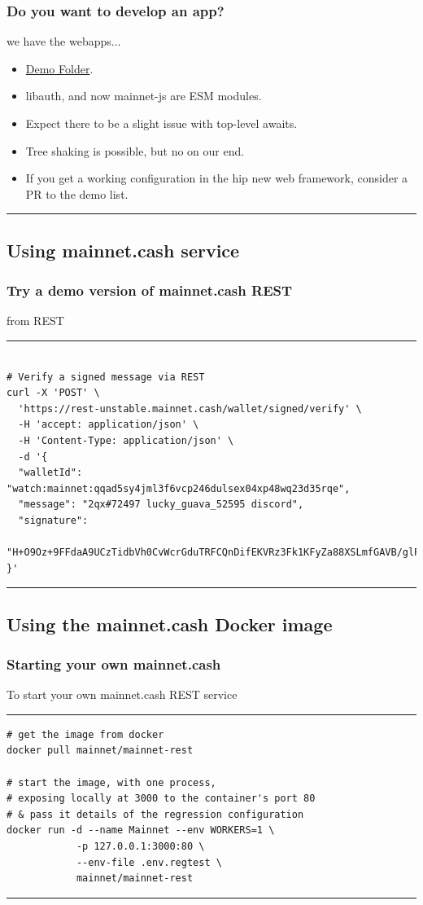 \documentclass{beamer}
\begin{document}
\begin{frame}[fragile]
    \frametitle{Do you want to develop an app?}
    we have the webapps...
    \begin{itemize}
      \item
        \href{https://github.com/mainnet-cash/mainnet-js/tree/master/demo/vue-nuxt}{Demo Folder}.
        \item
        libauth, and now mainnet-js are ESM modules.
        \item
        Expect there to be a slight issue with top-level awaits.
        \item
        Tree shaking is possible, but no on our end.
        \item
        If you get a working configuration in the hip new web framework, consider a PR to the demo list.
      \end{itemize}
        
\rule{\textwidth}{0.4pt}
\end{frame}

\subsection[Unstable REST]{Using mainnet.cash service}

\begin{frame}[fragile]
  \frametitle{Try a demo version of mainnet.cash REST}
    from REST
  \rule{\textwidth}{0.4pt}
  \tiny
  \begin{verbatim}
    
# Verify a signed message via REST
curl -X 'POST' \
  'https://rest-unstable.mainnet.cash/wallet/signed/verify' \
  -H 'accept: application/json' \
  -H 'Content-Type: application/json' \
  -d '{
  "walletId": "watch:mainnet:qqad5sy4jml3f6vcp246dulsex04xp48wq23d35rqe",
  "message": "2qx#72497 lucky_guava_52595 discord",
  "signature": 
  "H+O9Oz+9FFdaA9UCzTidbVh0CvWcrGduTRFCQnDifEKVRz3Fk1KFyZa88XSLmfGAVB/glP8OFRJqSatZtzo8h9I="
}'

  \end{verbatim}
\rule{\textwidth}{0.6pt}
\end{frame}

\subsection[Docker image]{Using the mainnet.cash Docker image}

\begin{frame}[fragile]
    \frametitle{Starting your own mainnet.cash}
      To start your own mainnet.cash REST service
    \rule{\textwidth}{0.9pt}
    \tiny
    \begin{verbatim}
# get the image from docker
docker pull mainnet/mainnet-rest

# start the image, with one process, 
# exposing locally at 3000 to the container's port 80
# & pass it details of the regression configuration
docker run -d --name Mainnet --env WORKERS=1 \ 
            -p 127.0.0.1:3000:80 \ 
            --env-file .env.regtest \
            mainnet/mainnet-rest
    \end{verbatim}
\rule{\textwidth}{0.9pt}

\end{frame}
\end{document}
